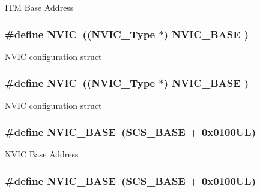 I\-T\-M Base Address \hypertarget{group___c_m_s_i_s__core__register_gac8e97e8ce56ae9f57da1363a937f8a17}{
\subsubsection[{N\-V\-I\-C}]{\setlength{\rightskip}{0pt plus 5cm}\#define N\-V\-I\-C~(({\bf N\-V\-I\-C\-\_\-\-Type}      $\ast$)     {\bf N\-V\-I\-C\-\_\-\-B\-A\-S\-E}     )}}\label{group___c_m_s_i_s__core__register_gac8e97e8ce56ae9f57da1363a937f8a17}
N\-V\-I\-C configuration struct \hypertarget{group___c_m_s_i_s__core__register_gac8e97e8ce56ae9f57da1363a937f8a17}{
\subsubsection[{N\-V\-I\-C}]{\setlength{\rightskip}{0pt plus 5cm}\#define N\-V\-I\-C~(({\bf N\-V\-I\-C\-\_\-\-Type}      $\ast$)     {\bf N\-V\-I\-C\-\_\-\-B\-A\-S\-E}     )}}\label{group___c_m_s_i_s__core__register_gac8e97e8ce56ae9f57da1363a937f8a17}
N\-V\-I\-C configuration struct \hypertarget{group___c_m_s_i_s__core__register_gaa0288691785a5f868238e0468b39523d}{
\subsubsection[{N\-V\-I\-C\-\_\-\-B\-A\-S\-E}]{\setlength{\rightskip}{0pt plus 5cm}\#define N\-V\-I\-C\-\_\-\-B\-A\-S\-E~({\bf S\-C\-S\-\_\-\-B\-A\-S\-E} +  0x0100\-U\-L)}}\label{group___c_m_s_i_s__core__register_gaa0288691785a5f868238e0468b39523d}
N\-V\-I\-C Base Address \hypertarget{group___c_m_s_i_s__core__register_gaa0288691785a5f868238e0468b39523d}{
\subsubsection[{N\-V\-I\-C\-\_\-\-B\-A\-S\-E}]{\setlength{\rightskip}{0pt plus 5cm}\#define N\-V\-I\-C\-\_\-\-B\-A\-S\-E~({\bf S\-C\-S\-\_\-\-B\-A\-S\-E} +  0x0100\-U\-L)}}\label{group___c_m_s_i_s__core__register_gaa0288691785a5f868238e0468b39523d}
